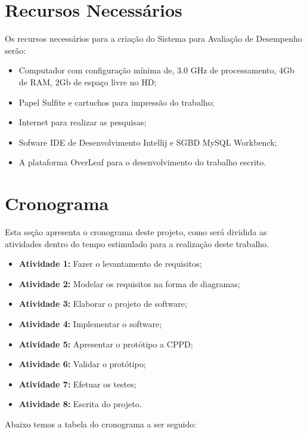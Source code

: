 \chapter{Recursos Necessários}

Os recursos necessários para a criação do Sistema para Avaliação de Desempenho serão:
    
\begin{itemize}
    \item Computador com configuração mínima de, 3.0 GHz de processamento, 4Gb de RAM, 2Gb de espaço livre no HD;
    \item Papel Sulfite e cartuchos para impressão do trabalho;
    \item Internet para realizar as pesquisas;
    \item Sofware IDE de Desenvolvimento Intellij e SGBD MySQL Workbenck;
    \item A plataforma OverLeaf para o desenvolvimento do trabalho escrito.
\end{itemize}



\chapter{Cronograma}

    Esta seção apresenta o cronograma deste projeto, como será dividida as atividades dentro do tempo estimulado para a realização deste trabalho. 
    
\begin{itemize}
    \item \textbf{Atividade 1:} Fazer o levantamento de requisitos;
    \item \textbf{Atividade 2:} Modelar os requisitos na forma de diagramas;
    \item \textbf{Atividade 3:} Elaborar o projeto de software; 
    \item \textbf{Atividade 4:} Implementar o software;
    \item \textbf{Atividade 5:} Apresentar o protótipo a CPPD;
    \item \textbf{Atividade 6:} Validar o protótipo;
    \item \textbf{Atividade 7:} Efetuar os testes;
    \item \textbf{Atividade 8:} Escrita do projeto.
\end{itemize}

    Abaixo temos a tabela do cronograma a ser seguido:
    


